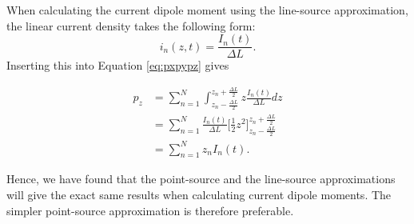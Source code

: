 \documentclass[preprint,10pt,authoryear]{elsarticle}
\begin{document}
When calculating the current dipole moment using the line-source approximation, the linear current density takes the following form:
\begin{equation}
i_n(z,t) = \frac{I_n(t)}{\Delta L}.
\end{equation}
Inserting this into Equation \eqref{eq:pxpypz} gives

\begin{align}
p_z
& = \sum_{n=1}^N \int_{z_n - \frac{\Delta L}{2}}^{z_n + \frac{\Delta L}{2}} z \frac{I_n(t)}{\Delta L}dz \nonumber \\
& = \sum_{n=1}^N \frac{I_n(t)}{\Delta L} \big[\frac{1}{2} z^2\big]_{z_n - \frac{\Delta L}{2}}^{z_n + \frac{\Delta L}{2}} \\
& = \sum_{n=1}^N z_n I_n(t). \nonumber
\end{align}

Hence, we have found that the point-source and the line-source approximations will give the exact same results when calculating current dipole moments. The simpler point-source approximation is therefore preferable.


\end{document}
